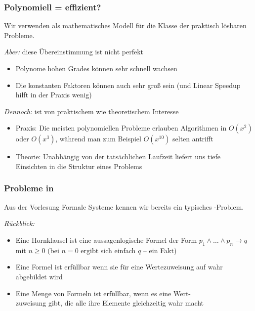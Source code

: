 \documentclass[onlymath]{beamer}
\begin{document}
\begin{frame}\frametitle{Polynomiell = effizient?}

Wir verwenden  als mathematisches Modell für die Klasse
der praktisch lösbaren Probleme.
\bigskip

\emph{Aber:} diese Übereinstimmung ist nicht perfekt
\begin{itemize}
\item Polynome hohen Grades können sehr schnell wachsen
\item Die konstanten Faktoren können auch sehr groß sein (und Linear Speedup hilft in der Praxis wenig)
\end{itemize}\bigskip\pause

\emph{Dennoch:}  ist von praktischem wie theoretischem Interesse
\begin{itemize}
\item \alert{Praxis:} Die meisten polynomiellen Probleme erlauben Algorithmen in $O(x^2)$ oder $O(x^3)$, während man zum Beispiel $O(x^{10})$ selten antrifft
\item \alert{Theorie:} Unabhängig von der tatsächlichen Laufzeit liefert uns  tiefe Einsichten in die Struktur eines Problems
\end{itemize}

\end{frame}

\begin{frame}\frametitle{Probleme in }

Aus der Vorlesung Formale Systeme kennen wir bereits ein
typisches -Problem.\bigskip

\emph{Rückblick:}
\begin{itemize}
\item Eine \alert{Hornklausel} ist eine aussagenlogische Formel der Form $p_1\wedge\ldots\wedge p_n\to q$ mit $n\geq 0$
{\tiny (bei $n=0$ ergibt sich einfach $q$ -- ein \alert{Fakt})}
\item Eine Formel ist \alert{erfüllbar} wenn sie für eine Wertezuweisung auf wahr abgebildet wird
\item Eine Menge von Formeln ist erfüllbar, wenn es eine Wert-\\zuweisung gibt, die alle
ihre Elemente gleichzeitig wahr macht
\end{itemize}\bigskip


\end{frame}
\end{document}
